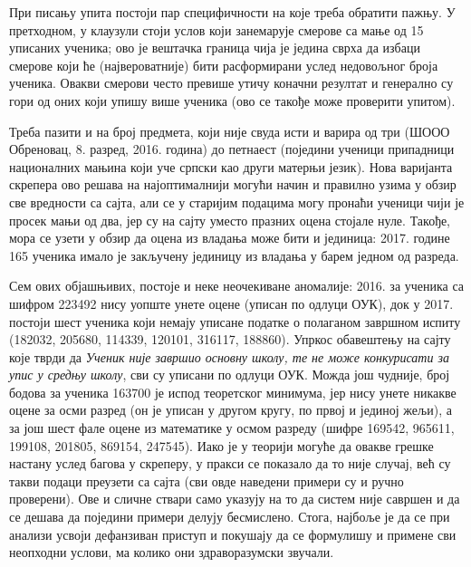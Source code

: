 При писању упита постоји пар специфичности на које треба обратити пажњу. У претходном, у  клаузули стоји услов који занемарује смерове са мање од 15 уписаних ученика; ово је вештачка граница чија је једина сврха да избаци смерове који ће (највероватније) бити расформирани услед недовољног броја ученика. Овакви смерови често превише утичу коначни резултат и генерално су гори од оних који упишу више ученика (ово се такође може проверити упитом). 

Треба пазити и на број предмета, који није свуда исти и варира од три (ШООО Обреновац, 8. разред, 2016. година) до петнаест (поједини ученици припадници националних мањина који уче српски као други матерњи језик). Нова варијанта скрепера ово решава на најоптималнији могући начин и правилно узима у обзир све вредности са сајта, али се у старијим подацима могу пронаћи ученици чији је просек мањи од два, јер су на сајту уместо празних оцена стојале нуле. Такође, мора се узети у обзир да оцена из владања може бити и јединица: 2017. године 165 ученика имало је закључену јединицу из владања у барем једном од разреда.

Сем ових објашњивих, постоје и неке неочекиване аномалије: 2016. за ученика са шифром 223492 нису уопште унете оцене (уписан по одлуци ОУК), док у 2017. постоји шест ученика који немају уписане податке о полаганом завршном испиту (182032, 205680, 114339, 120101, 316117, 188860). Упркос обавештењу на сајту које тврди да \emph{Ученик није завршио основну школу, те не може конкурисати за упис у средњу школу}, сви су уписани по одлуци ОУК. Можда још чудније, број бодова за ученика 163700 је испод теоретског минимума, јер нису унете никакве оцене за осми разред (он је уписан у другом кругу, по првој и јединој жељи), а за још шест фале оцене из математике у осмом разреду (шифре 169542, 965611, 199108, 201805, 869154, 247545). Иако је у теорији могуће да овакве грешке настану услед багова у скреперу, у пракси се показало да то није случај, већ су такви подаци преузети са сајта (сви овде наведени примери су и ручно проверени). Ове и сличне ствари само указују на то да систем није савршен и да се дешава да поједини примери делују бесмислено. Стога, најбоље је да се при анализи усвоји дефанзиван приступ и покушају да се формулишу и примене сви неопходни услови, ма колико они здраворазумски звучали.